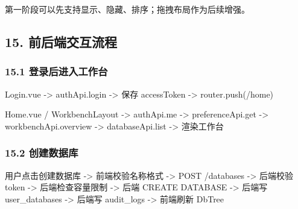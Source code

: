 \documentclass[
  a4paper,
  UTF8]{ctexart}
\newenvironment{Shaded}{}{}
\newcommand{\NormalTok}[1]{#1}
\begin{document}
第一阶段可以先支持显示、隐藏、排序；拖拽布局作为后续增强。

\hypertarget{ux524dux540eux7aefux4ea4ux4e92ux6d41ux7a0b}{%
\subsection{15.
前后端交互流程}\label{ux524dux540eux7aefux4ea4ux4e92ux6d41ux7a0b}}

\hypertarget{ux767bux5f55ux540eux8fdbux5165ux5de5ux4f5cux53f0}{%
\subsubsection{15.1
登录后进入工作台}\label{ux767bux5f55ux540eux8fdbux5165ux5de5ux4f5cux53f0}}

\begin{Shaded}
\begin{Highlighting}[]
\NormalTok{Login.vue}
\NormalTok{  {-}\textgreater{} authApi.login}
\NormalTok{  {-}\textgreater{} 保存 accessToken}
\NormalTok{  {-}\textgreater{} router.push(\textquotesingle{}/home\textquotesingle{})}

\NormalTok{Home.vue / WorkbenchLayout}
\NormalTok{  {-}\textgreater{} authApi.me}
\NormalTok{  {-}\textgreater{} preferenceApi.get}
\NormalTok{  {-}\textgreater{} workbenchApi.overview}
\NormalTok{  {-}\textgreater{} databaseApi.list}
\NormalTok{  {-}\textgreater{} 渲染工作台}
\end{Highlighting}
\end{Shaded}

\hypertarget{ux521bux5efaux6570ux636eux5e93}{%
\subsubsection{15.2 创建数据库}\label{ux521bux5efaux6570ux636eux5e93}}

\begin{Shaded}
\begin{Highlighting}[]
\NormalTok{用户点击创建数据库}
\NormalTok{  {-}\textgreater{} 前端校验名称格式}
\NormalTok{  {-}\textgreater{} POST /databases}
\NormalTok{  {-}\textgreater{} 后端校验 token}
\NormalTok{  {-}\textgreater{} 后端检查容量限制}
\NormalTok{  {-}\textgreater{} 后端 CREATE DATABASE}
\NormalTok{  {-}\textgreater{} 后端写 user\_databases}
\NormalTok{  {-}\textgreater{} 后端写 audit\_logs}
\NormalTok{  {-}\textgreater{} 前端刷新 DbTree}
\end{Highlighting}
\end{Shaded}
\end{document}
